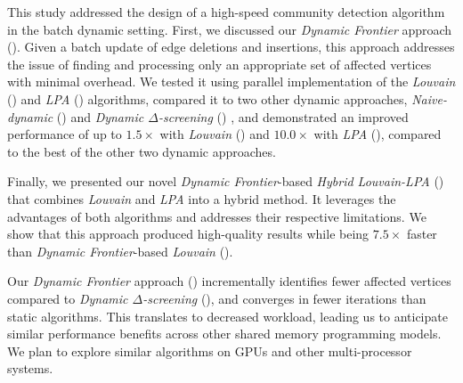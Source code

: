 This study addressed the design of a high-speed community detection algorithm in the batch dynamic setting. First, we discussed our \textit{Dynamic Frontier} approach (\Fro{}). Given a batch update of edge deletions and insertions, this approach addresses the issue of finding and processing only an appropriate set of affected vertices with minimal overhead. We tested it using parallel implementation of the \textit{Louvain} (\FroLou{}) and \textit{LPA} (\FroLPA{}) algorithms, compared it to two other dynamic approaches, \textit{Naive-dynamic} (\Nai{}) and \textit{Dynamic $\Delta$-screening} (\Del{}) \cite{com-zarayeneh21}, and demonstrated an improved performance of up to $1.5\times$ with \textit{Louvain} (\FroLou{}) and $10.0\times$ with \textit{LPA} (\FroLPA{}), compared to the best of the other two dynamic approaches.

Finally, we presented our novel \textit{Dynamic Frontier}-based \textit{Hybrid Louvain-LPA} (\FroHyb{}) that combines \textit{Louvain} and \textit{LPA} into a hybrid method. It leverages the advantages of both algorithms and addresses their respective limitations. We show that this approach produced high-quality results while being $7.5\times$ faster than \textit{Dynamic Frontier}-based \textit{Louvain} (\FroLou{}).

Our \textit{Dynamic Frontier} approach (\Fro{}) incrementally identifies fewer affected vertices compared to \textit{Dynamic $\Delta$-screening} (\Del{}), and converges in fewer iterations than static algorithms. This translates to decreased workload, leading us to anticipate similar performance benefits across other shared memory programming models. We plan to explore similar algorithms on GPUs and other multi-processor systems.

